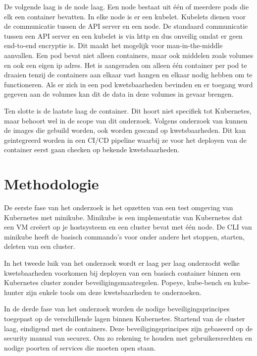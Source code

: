 De volgende laag is de node laag. Een node bestaat uit één of meerdere pods die elk een container bevatten. In elke node is er een kubelet. Kubelets dienen voor de communicatie tussen de API server en een node. \autocite{Rice2018} De standaard communicatie tussen een API server en een kubelet is via http en dus onveilig omdat er geen end-to-end encryptie is. Dit maakt het mogelijk voor man-in-the-middle aanvallen.
\autocite{kubernetespods-2022} Een pod bevat niet alleen containers, maar ook middelen zoals volumes en ook een eigen ip adres. Het is aangeraden om alleen één container per pod te draaien tenzij de containers aan elkaar vast hangen en elkaar nodig hebben om te functioneren. Als er zich in een pod kwetsbaarheden bevinden en er toegang word gegeven aan de volumes kan dit de data in deze volumes in gevaar brengen.


Ten slotte is de laatste laag de container. Dit hoort niet specifiek tot Kubernetes, maar behoort wel in de scope van dit onderzoek. Volgens onderzoek van \textcite{Rice2018} kunnen de images die gebuild worden, ook worden gescand op kwetsbaarheden. Dit kan geintegreerd worden in een CI/CD pipeline waarbij ze voor het deployen van de container eerst gaan checken op bekende kwetsbaarheden. 


\section{Methodologie}%
\label{sec:methodologie}

De eerste fase van het onderzoek is het opzetten van een test omgeving van Kubernetes met minikube.\autocite{kubernetesMinicube-2022} Minikube is een implementatie van Kubernetes dat een VM creëert op je hostsysteem en een cluster bevat met één node. De CLI van minikube heeft de basisch commando's voor onder andere het stoppen, starten, deleten van een cluster. 

In het tweede luik van het onderzoek wordt er laag per laag onderzocht welke kwetsbaarheden voorkomen bij deployen van een basisch container binnen een Kubernetes cluster zonder beveiligingsmaatregelen. Popeye, kube-bench en kube-hunter zijn enkele tools om deze kwetsbaarheden te onderzoeken.

In de derde fase van het onderzoek worden de nodige beveiligingsprincipes toegepast op de verschillende lagen binnen Kubernetes. Startend van de cluster laag, eindigend met de containers. Deze beveiligingsprincipes zijn gebaseerd op de security manual van securex. Om zo rekening te houden met gebruikersrechten en nodige poorten of services die moeten open staan.

